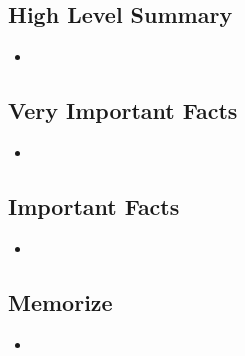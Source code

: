 \subsection{High Level Summary}

    \begin{itemize}

    \item 
    
    \end{itemize}

\subsection{Very Important Facts}

    \begin{itemize}

    \item 
    
    \end{itemize}

\subsection{Important Facts}

    \begin{itemize}

    \item 
    
    \end{itemize}

\subsection{Memorize}

    \begin{itemize}

    \item 
    
    \end{itemize}

